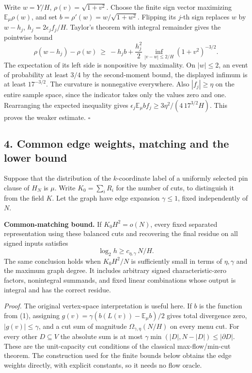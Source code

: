 \documentclass[
  11pt,
]{article}
\begin{document}
Write \(w=Y/H\), \(\rho(v)=\sqrt{1+v^2}\). Choose the finite sign vector
maximizing \(\mathbb E_\mu\rho(w)\), and set
\(b=\rho'(w)=w/\sqrt{1+w^2}\). Flipping its \(j\)-th sign replaces \(w\)
by \(w-h_j\), \(h_j=2\epsilon_j f_j/H\). Taylor's theorem with integral
remainder gives the pointwise bound \[
        \rho(w-h_j)-\rho(w)\ \ge\
        -h_j b+\frac{h_j^2}{2}
          \inf_{|v-w|\le 2/H}(1+v^2)^{-3/2}.
\] The expectation of its left side is nonpositive by maximality. On
\(|w|\le2\), an event of probability at least \(3/4\) by the
second-moment bound, the displayed infimum is at least \(17^{-3/2}\).
The curvature is nonnegative everywhere. Also \(|f_j|\ge\eta\) on the
entire sample space, since the indicator takes only the values zero and
one. Rearranging the expected inequality gives
\(\epsilon_j\mathbb E_\mu bf_j\ge3\eta^2/(4\,17^{3/2}H)\). This proves
the weaker estimate. \(\square\)

\subsection{4. Common edge weights, matching and the lower
bound}\label{flow-matching-and-the-lower-bound}

Suppose that the distribution of the \(k\)-coordinate label of a
uniformly selected pin clause of \(H_N\) is \(\mu\). Write \(K_0=\sum_i R_i\) for the number of cuts, to distinguish it from the field \(K\).
Let the graph have edge expansion \(\gamma\le1\), fixed independently of
\(N\).

\textbf{Common-matching bound.} If \(K_0 H^2=o(N)\), every fixed separated
representation using these balanced cuts and recovering the final
residue on all signed inputs satisfies \[
                      \log_2 h\ge c_{\eta,\gamma}\,N/H .
 \tag{2}
\] The same conclusion holds when \(K_0 H^2/N\) is sufficiently small in
terms of \(\eta,\gamma\) and the maximum graph degree. It includes
arbitrary signed characteristic-zero factors, nonintegral summands, and
fixed linear combinations whose output is integral and has the correct
residue.

\emph{Proof.} The original vertex-space interpretation is useful here.
If \(b\) is the function from (1), assigning \(g(v)=\gamma
(b(L(v))-\mathbb E_\mu b)/2\) gives total divergence zero,
\(|g(v)|\le\gamma\), and a cut sum of magnitude
\(\Omega_{\gamma,\eta}(N/H)\) on every menu cut. For every other
\(D\subseteq V\) the absolute sum is at most
\(\gamma\min(|D|,N-|D|)\le|\partial D|\). These are the unit-capacity
cut conditions of the classical max-flow/min-cut theorem. The construction
used for the finite bounds below obtains the edge weights directly, with
explicit constants, so it needs no flow oracle.
\end{document}
